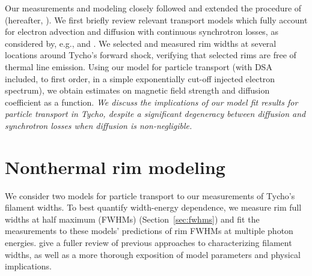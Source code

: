 \documentclass[iop, apj, numberedappendix, twocolappendix]{emulateapj}
\newcommand*{\mt}{\mathrm}
\newcommand*{\tsynch}{\tau_{\mt{synch}}}
\begin{document}
Our measurements and modeling closely followed and extended the procedure of
\citet{ressler2014} (hereafter, ).  We first briefly
review relevant transport models which fully account for electron advection and
diffusion with continuous synchrotron losses, as considered by, e.g.,
\citet[and references therein]{berezhko2004} and \citet{rettig2012}.
We selected and measured rim widths at several locations around Tycho's forward
shock, verifying that selected rims are free of thermal line emission.  Using
our model for particle transport (with DSA included, to first order, in a
simple exponentially cut-off injected electron spectrum), we obtain estimates
on magnetic field strength and diffusion coefficient as a function. \emph{We
discuss the implications of our model fit results for particle transport in
Tycho, despite a significant degeneracy between diffusion and synchrotron
losses when diffusion is non-negligible.}

\section{Nonthermal rim modeling}\label{sec:models}

We consider two models for particle transport to our measurements of Tycho's
filament widths.  To best quantify width-energy dependence, we measure rim full
widths at half maximum (FWHMs) (Section~\ref{sec:fwhms}) and fit the
measurements to these models' predictions of rim FWHMs at multiple photon
energies.   give a fuller review of previous approaches
to characterizing filament widths, as well as a more thorough exposition of
model parameters and physical implications.

\end{document}
